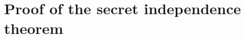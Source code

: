 \documentclass[acmsmall,review,anonymous]{acmart}\settopmatter{printfolios=true}
\begin{document}


\newpage
\section{Proof of the secret independence theorem}

\begin{small}

\end{small}









\newpage
\fi%




\iflong
\else
\balance
\fi
\end{document}
